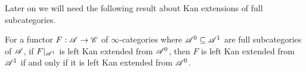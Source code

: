 \documentclass[../../thesis.tex]{subfiles}
\begin{document}
Later on we will need the following result about Kan extensions of full subcategories.
\begin{proposition}\label{4.3.2.8}
    For a functor $F: \mathscr{A}\to\mathscr{C}$ of $\infty$-categories where $\mathscr{A}^0 \subseteq \mathscr{A}^1$ are full subcategories of $\mathscr{A}$, if $F|_{\mathscr{A}^1}$ is left Kan extended from $\mathscr{A}^0$, then $F$ is left Kan extended from $\mathscr{A}^1$ if and only if it is left Kan extended from $\mathscr{A}^0$.
\end{proposition}
\end{document}
